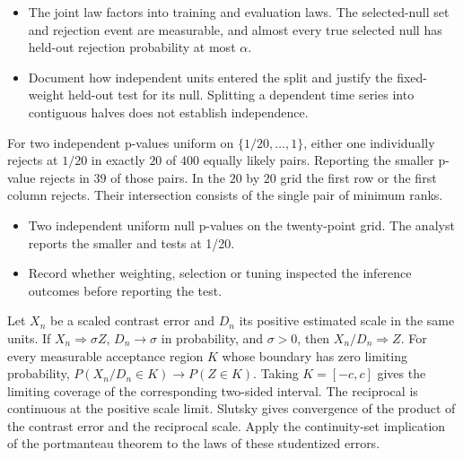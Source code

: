 \expandafter\def\csname statadic@assumptions@STATADIC-SELECTION-001\endcsname{\begin{itemize}
\item The joint law factors into training and evaluation laws. The selected-null set and rejection event are measurable, and almost every true selected null has held-out rejection probability at most \ensuremath{\alpha}.
\end{itemize}}
\expandafter\def\csname statadic@diagnostics@STATADIC-SELECTION-001\endcsname{\begin{itemize}
\item Document how independent units entered the split and justify the fixed-weight held-out test for its null. Splitting a dependent time series into contiguous halves does not establish independence.
\end{itemize}}
\expandafter\def\csname statadic@statement@STATADIC-SELECTION-002\endcsname{For two independent p-values uniform on
  $\{1/20,\ldots,1\}$, either one individually rejects at $1/20$ in
  exactly $20$ of $400$ equally likely pairs. Reporting the smaller p-value
  rejects in $39$ of those pairs.}
\expandafter\def\csname statadic@proof@STATADIC-SELECTION-002\endcsname{In the $20$ by $20$ grid the first row or the first column
  rejects. Their intersection consists of the single pair of minimum ranks.}
\expandafter\def\csname statadic@assumptions@STATADIC-SELECTION-002\endcsname{\begin{itemize}
\item Two independent uniform null p-values on the twenty-point grid. The analyst reports the smaller and tests at 1/20.
\end{itemize}}
\expandafter\def\csname statadic@diagnostics@STATADIC-SELECTION-002\endcsname{\begin{itemize}
\item Record whether weighting, selection or tuning inspected the inference outcomes before reporting the test.
\end{itemize}}
\expandafter\def\csname statadic@statement@STATADIC-WALD-001\endcsname{Let $X_n$ be a scaled contrast error and $D_n$ its positive
  estimated scale in the same units. If $X_n\Rightarrow\sigma Z$, $D_n\to\sigma$
  in probability, and $\sigma>0$, then $X_n/D_n\Rightarrow Z$.
  For every measurable acceptance region $K$ whose boundary has zero limiting
  probability, $P(X_n/D_n\in K)\to P(Z\in K)$. Taking $K=[-c,c]$ gives
  the limiting coverage of the corresponding two-sided interval.}
\expandafter\def\csname statadic@proof@STATADIC-WALD-001\endcsname{The reciprocal is continuous at the positive scale limit.
  Slutsky gives convergence of the product of the contrast error and the
  reciprocal scale. Apply the continuity-set implication of the portmanteau
  theorem to the laws of these studentized errors.}
